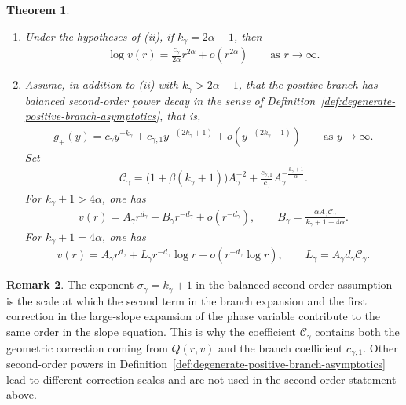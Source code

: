 \documentclass{amsart}
\theoremstyle{plain}
\newtheorem{theorem}{Theorem}[section]
\theoremstyle{mainintrothm}
\theoremstyle{definition}
\newtheorem{remark}[theorem]{Remark}
\begin{document}
\begin{theorem}
\begin{enumerate}[label=\textup{(\roman*)}]
		\item Under the hypotheses of \textup{(ii)}, if
		$k_\gamma=2\alpha-1$, then
		\begin{align*}
			\log v(r)
			=
			\frac{c_\gamma}{2\alpha}r^{2\alpha}
			+
			o(r^{2\alpha})
			\qquad
			\text{as }r\to\infty.
		\end{align*}
		
		\item Assume, in addition to \textup{(ii)} with
		$k_\gamma>2\alpha-1$, that the positive branch has balanced second-order
		power decay in the sense of
		Definition~\ref{def:degenerate-positive-branch-asymptotics}, that is,
		\begin{align*}
			g_+(y)
			=
			c_\gamma y^{-k_\gamma}
			+
			c_{\gamma,1}y^{-(2k_\gamma+1)}
			+
			o\left(y^{-(2k_\gamma+1)}\right)
			\qquad
			\text{as }y\to\infty.
		\end{align*}
		Set
		\begin{align*}
			\mathcal C_\gamma
			=
			\bigl(1+\beta(k_\gamma+1)\bigr)A_\gamma^{-2}
			+
			\frac{c_{\gamma,1}}{c_\gamma}
			A_\gamma^{-\frac{k_\gamma+1}{\alpha}}.
		\end{align*}
		For $k_\gamma+1>4\alpha$, one has
		\begin{align*}
			v(r)
			=
			A_\gamma r^{d_\gamma}
			+
			B_\gamma r^{-d_\gamma}
			+
			o(r^{-d_\gamma}),
			\qquad
			B_\gamma
			=
			\frac{\alpha A_\gamma\mathcal C_\gamma}
			{k_\gamma+1-4\alpha}.
		\end{align*}
		For $k_\gamma+1=4\alpha$, one has
		\begin{align*}
			v(r)
			=
			A_\gamma r^{d_\gamma}
			+
			L_\gamma r^{-d_\gamma}\log r
			+
			o(r^{-d_\gamma}\log r),
			\qquad
			L_\gamma
			=
			A_\gamma d_\gamma\mathcal C_\gamma.
		\end{align*}
		
		\end{enumerate}
	\end{theorem}
	
	\begin{remark}
		\label{rem:balanced-second-order-scale}
		The exponent $\sigma_\gamma=k_\gamma+1$ in the balanced second-order
		assumption is the scale at which the second term in the branch expansion
		and the first correction in the large-slope expansion of the phase variable
		contribute to the same order in the slope equation.  This is why the
		coefficient $\mathcal C_\gamma$ contains both the geometric correction
		coming from $Q(r,v)$ and the branch coefficient $c_{\gamma,1}$.  Other
		second-order powers in Definition~\ref{def:degenerate-positive-branch-asymptotics}
		lead to different correction scales and are not used in the second-order
		statement above.
	\end{remark}
	
\end{document}

